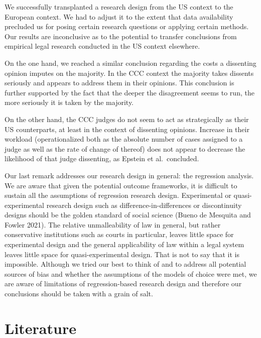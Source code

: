 \documentclass[
  11pt,
]{article}
\begin{document}
We successfully transplanted a research design from the US context to
the European context. We had to adjust it to the extent that data
availability precluded us for posing certain research questions or
applying certain methods. Our results are inconclusive as to the
potential to transfer conclusions from empirical legal research
conducted in the US context elsewhere.

On the one hand, we reached a similar conclusion regarding the costs a
dissenting opinion imputes on the majority. In the CCC context the
majority takes dissents seriously and appears to address them in their
opinions. This conclusion is further supported by the fact that the
deeper the disagreement seems to run, the more seriously it is taken by
the majority.

On the other hand, the CCC judges do not seem to act as strategically as
their US counterparts, at least in the context of dissenting opinions.
Increase in their workload (operationalized both as the absolute number
of cases assigned to a judge as well as the rate of change of thereof)
does not appear to decrease the likelihood of that judge dissenting, as
Epstein et al.~concluded.

Our last remark addresses our research design in general: the regression
analysis. We are aware that given the potential outcome frameworks, it
is difficult to sustain all the assumptions of regression research
design. Experimental or quasi-experimental research design such as
difference-in-differences or discontinuity designs should be the golden
standard of social science (Bueno de Mesquita and Fowler 2021). The
relative unmalleability of law in general, but rather conservative
institutions such as courts in particular, leaves little space for
experimental design and the general applicability of law within a legal
system leaves little space for quasi-experimental design. That is not to
say that it is impossible. Although we tried our best to think of and to
address all potential sources of bias and whether the assumptions of the
models of choice were met, we are aware of limitations of
regression-based research design and therefore our conclusions should be
taken with a grain of salt.

\vspace{30pt}

\hypertarget{literature}{%
\section*{Literature}\label{literature}}
\end{document}
